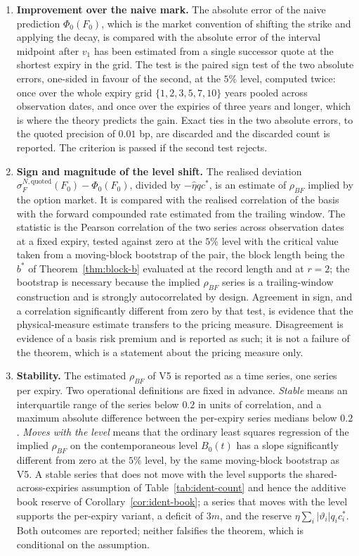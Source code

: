 \documentclass[../../../main.tex]{subfiles}
\begin{document}
\begin{enumerate}[label=\textbf{V\arabic*.},leftmargin=2.2\parindent]
\item \textbf{Improvement over the naive mark.} The absolute error of the naive prediction $\Phi_0(F_0)$, which is the market convention of shifting the strike and applying the decay, is compared with the absolute error of the interval midpoint after $v_1$ has been estimated from a single successor quote at the shortest expiry in the grid. The test is the paired sign test of the two absolute errors, one-sided in favour of the second, at the $5\%$ level, computed twice: once over the whole expiry grid $\{1,2,3,5,7,10\}$ years pooled across observation dates, and once over the expiries of three years and longer, which is where the theory predicts the gain. Exact ties in the two absolute errors, to the quoted precision of $0.01$ bp, are discarded and the discarded count is reported. The criterion is passed if the second test rejects.
\item \textbf{Sign and magnitude of the level shift.} The realised deviation $\sigma^{N,\text{quoted}}_F(F_0)-\Phi_0(F_0)$, divided by $-\hat\eta qc^*$, is an estimate of $\rho_{BF}$ implied by the option market. It is compared with the realised correlation of the basis with the forward compounded rate estimated from the trailing window. The statistic is the Pearson correlation of the two series across observation dates at a fixed expiry, tested against zero at the $5\%$ level with the critical value taken from a moving-block bootstrap of the pair, the block length being the $b^*$ of Theorem~\ref{thm:block-b} evaluated at the record length and at $r=2$; the bootstrap is necessary because the implied $\rho_{BF}$ series is a trailing-window construction and is strongly autocorrelated by design. Agreement in sign, and a correlation significantly different from zero by that test, is evidence that the physical-measure estimate transfers to the pricing measure. Disagreement is evidence of a basis risk premium and is reported as such; it is not a failure of the theorem, which is a statement about the pricing measure only.
\item \textbf{Stability.} The estimated $\rho_{BF}$ of V5 is reported as a time series, one series per expiry. Two operational definitions are fixed in advance. \emph{Stable} means an interquartile range of the series below $0.2$ in units of correlation, and a maximum absolute difference between the per-expiry series medians below $0.2$. \emph{Moves with the level} means that the ordinary least squares regression of the implied $\rho_{BF}$ on the contemporaneous level $B_0(t)$ has a slope significantly different from zero at the $5\%$ level, by the same moving-block bootstrap as V5. A stable series that does not move with the level supports the shared-across-expiries assumption of Table~\ref{tab:ident-count} and hence the additive book reserve of Corollary~\ref{cor:ident-book}; a series that moves with the level supports the per-expiry variant, a deficit of $3m$, and the reserve $\eta\sum_i|\vartheta_i|q_ic^*_i$. Both outcomes are reported; neither falsifies the theorem, which is conditional on the assumption.
\end{enumerate}
\end{document}
